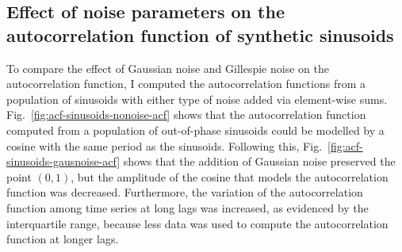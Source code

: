 \subsection{Effect of noise parameters on the autocorrelation function of synthetic sinusoids}
\label{subsec:analysis-characterisation-acf-sinusoid}

To compare the effect of Gaussian noise and Gillespie noise on the autocorrelation function, I computed the autocorrelation functions from a population of sinusoids with either type of noise added via element-wise sums.
Fig.\ \ref{fig:acf-sinusoids-nonoise-acf} shows that the autocorrelation function computed from a population of out-of-phase sinusoids could be modelled by a cosine with the same period as the sinusoids.
Following this, Fig.\ \ref{fig:acf-sinusoids-gausnoise-acf} shows that the addition of Gaussian noise preserved the point $(0,1)$, but the amplitude of the cosine that models the autocorrelation function was decreased.
Furthermore, the variation of the autocorrelation function among time series at long lags was increased, as evidenced by the interquartile range, because less data was used to compute the autocorrelation function at longer lags.%

